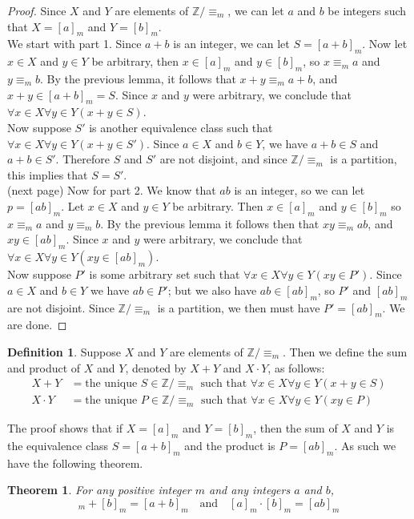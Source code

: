 \documentclass{report}
\newtheorem*{theorem}{Theorem}
\theoremstyle{definition}
\newtheorem*{definition}{Definition}
\begin{document}
\begin{proof}
Since $X$ and $Y$ are elements of $\mathbb Z/\equiv_m$, we can let $a$ and $b$ be integers such that $X=[a]_m$ and $Y=[b]_m$.\\
\indent We start with part 1. Since $a+b$ is an integer, we can let $S=[a+b]_m$.
Now let $x\in X$ and $y\in Y$ be arbitrary, then $x\in[a]_m$ and $y\in[b]_m$, so $x\equiv_ma$ and $y\equiv_mb$. By the previous lemma, it follows that $x+y\equiv_ma+b$, and $x+y\in[a+b]_m=S$.
Since $x$ and $y$ were arbitrary, we conclude that $\forall x\in X\forall y\in Y(x+y\in S)$.\\
\indent Now suppose $S'$ is another equivalence class such that $\forall x\in X\forall y\in Y(x+y\in S')$. Since $a\in X$ and $b\in Y$, we have $a+b\in S$ and $a+b\in S'$. Therefore $S$ and $S'$ 
are not disjoint, and since $\mathbb Z/\equiv_m$ is a partition, this implies that 
$S=S'$.\\
\noindent(next page)\newpage
\indent Now for part 2. We know that $ab$ is an integer, so we can let $p=[ab]_m$. Let $x\in X$ and $y\in Y$ be arbitrary. Then $x\in[a]_m$ and $y\in[b]_m$ so $x\equiv_ma$ and $y\equiv_mb$. 
By the previous lemma it follows then that $xy\equiv_mab$, and $xy\in[ab]_m$.
Since $x$ and $y$ were arbitrary, we conclude that $\forall x\in X \forall y\in Y(xy\in[ab]_m)$.\\
\indent Now suppose $P'$ is some arbitrary set such that $\forall x\in X \forall y\in Y(xy\in P')$.
Since $a\in X$ and $b\in Y$ we have $ab\in P'$; but we also have $ab\in[ab]_m$, so $P'$ and $[ab]_m$ are not disjoint. Since $\mathbb Z/\equiv_m$ is a partition, we then must have
$P'=[ab]_m$. We are done.
\end{proof}
\begin{definition}
Suppose $X$ and $Y$ are elements of $\mathbb Z/\equiv_m$. Then we define the sum and product of $X$ and $Y$, denoted by $X+Y$ and $X\cdot Y$, as follows:
\begin{align*}
X+Y&=\text{the unique $S\in\mathbb Z/\equiv_m$ such that $\forall x\in X\forall y\in Y(x+y\in S)$}\\
X\cdot Y&=\text{the unique $P\in\mathbb Z/\equiv_m$ such that $\forall x\in X\forall y\in Y(xy\in P)$}
\end{align*}
\end{definition}
\noindent The proof shows that if $X=[a]_m$ and $Y=[b]_m$, then the sum of $X$ and $Y$ is the equivalence class $S=[a+b]_m$ and the product is $P=[ab]_m$. As such we have the
following theorem.
\begin{theorem}
For any positive integer $m$ and any integers $a$ and $b$,
\begin{equation*}
[a]_m+[b]_m=[a+b]_m\quad\text{and}\quad[a]_m\cdot[b]_m=[ab]_m
\end{equation*}
\end{theorem}
\end{document}
